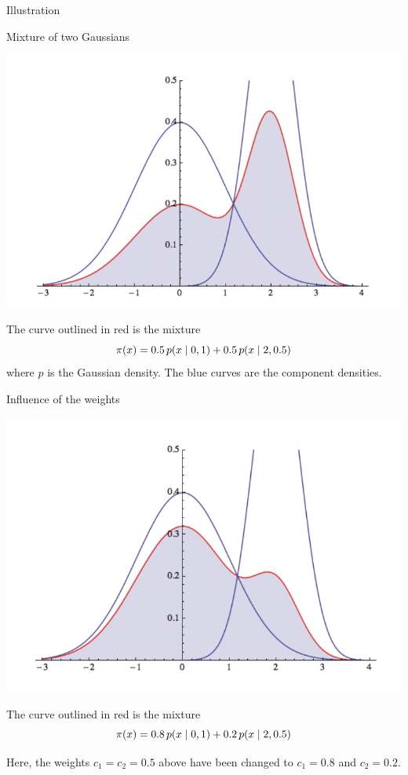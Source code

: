 \documentclass[10pt]{beamer}
\begin{document}
%
\begin{frame}{Illustration}
\begin{sblock}{Mixture of two Gaussians}
\begin{minipage}{0.4\textwidth}
\includegraphics[width=\textwidth]{images/gmm_weights_1}
\end{minipage} 
\hfill 
\begin{minipage}{0.5\textwidth}
The curve outlined in red is the mixture
\[ \pi(x) = 0.5 \, p(x \; | \; 0, 1) + 0.5 \, p(x \; | \; 2, 0.5) \]
where $p$ is the Gaussian density.  The blue curves are the component densities.
\end{minipage} 

\end{sblock}
\vfill

\begin{sblock}{Influence of the weights}
\begin{minipage}{0.4\textwidth}
\includegraphics[width=\textwidth]{images/gmm_weights_2}
\end{minipage} 
\hfill 
\begin{minipage}{0.5\textwidth}
The curve outlined in red is the mixture
\[ \pi(x) = 0.8\, p(x \; | \; 0, 1) + 0.2 \, p(x \; | \; 2, 0.5) \]

Here, the weights $c_1=c_2 =0.5$ above have been changed to $c_1 = 0.8$ and $c_2 = 0.2$.  
\end{minipage} 

\end{sblock}
\end{frame}
\end{document}
